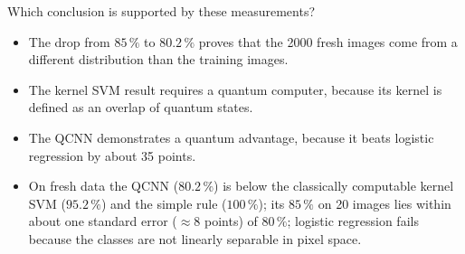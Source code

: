 \documentclass[11pt,a4paper]{article}
\newcommand{\optlabel}[1]{\textbf{(#1)}}
\newenvironment{qitem}[1]{\begin{list}{}{\setlength{\leftmargin}{3.3em}\setlength{\labelwidth}{3.1em}%
  \setlength{\labelsep}{0.2em}\setlength{\topsep}{3pt}\setlength{\parsep}{3pt}}\item[\textbf{Q.#1}\hfill]}{\end{list}}
\newcommand{\qsep}{\par\vspace{2pt}{\color{black!15}\hrule}\vspace{4pt}}
\begin{document}
\begin{qitem}{80}
Which conclusion is supported by these measurements?
\begin{itemize}[leftmargin=2.6em, labelsep=0.4em, itemsep=2pt, topsep=3pt]
\item[\optlabel{A}] The drop from $85\,\%$ to $80.2\,\%$ proves that the 2000 fresh images come from a different distribution than the training images.
\item[\optlabel{B}] The kernel SVM result requires a quantum computer, because its kernel is defined as an overlap of quantum states.
\item[\optlabel{C}] The QCNN demonstrates a quantum advantage, because it beats logistic regression by about 35 points.
\item[\optlabel{D}] On fresh data the QCNN ($80.2\,\%$) is below the classically computable kernel SVM ($95.2\,\%$) and the simple rule ($100\,\%$); its $85\,\%$ on 20 images lies within about one standard error ($\approx8$ points) of $80\,\%$; logistic regression fails because the classes are not linearly separable in pixel space.
\end{itemize}
\end{qitem}
\qsep

\newpage
\end{document}
